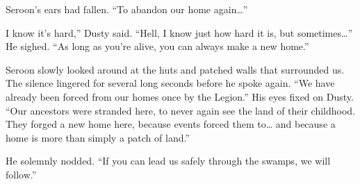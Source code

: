 Seroon’s ears had fallen. “To abandon our home again…”

\leavevmode{}I know it’s hard,” Dusty said. “Hell, I know just how hard it is, but sometimes…” He sighed. “As long as you’re alive, you can always make a new home.”

Seroon slowly looked around at the huts and patched walls that surrounded us. The silence lingered for several long seconds before he spoke again. “We have already been forced from our homes once by the Legion.” His eyes fixed on Dusty. “Our ancestors were stranded here, to never again see the land of their childhood. They forged a new home here, because events forced them to… and because a home is more than simply a patch of land.”

He solemnly nodded. “If you can lead us safely through the swamps, we will follow.”